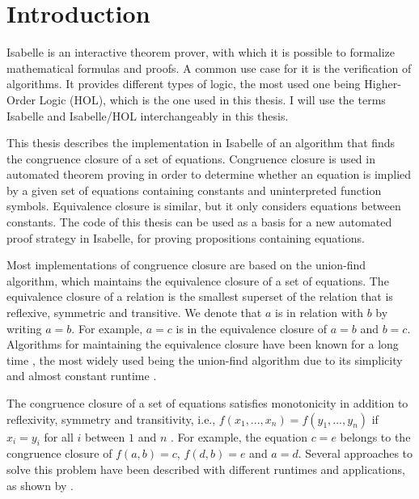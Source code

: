 
\chapter{Introduction}\label{chapter:introduction}

Isabelle \cite{isabelle} is an interactive theorem prover, with which it is possible to formalize mathematical formulas and proofs. A common use case for it is the verification of algorithms. It provides different types of logic, the most used one being Higher-Order Logic (HOL), which is the one used in this thesis. I will use the terms Isabelle and Isabelle/HOL interchangeably in this thesis.

This thesis describes the implementation in Isabelle of an algorithm that finds the congruence closure of a set of equations.
Congruence closure is used in automated theorem proving in order to determine whether an equation is implied by a given set of equations containing constants and uninterpreted function symbols. Equivalence closure is similar, but it only considers equations between constants.
The code of this thesis can be used as a basis for a new automated proof strategy in Isabelle, for proving propositions containing equations.

Most implementations of congruence closure are based on the union-find algorithm, which maintains the equivalence closure of a set of equations. The equivalence closure of a relation is the smallest superset of the relation that is reflexive, symmetric and transitive. We denote that $a$ is in relation with $b$ by writing $a = b$. For example, $a = c$ is in the equivalence closure of $a = b$ and $b = c$. Algorithms for maintaining the equivalence closure have been known for a long time \cite{unionfind-og}, the most widely used being the union-find algorithm due to its simplicity and almost constant runtime \cite{Tarjan}.

The congruence closure of a set of equations satisfies monotonicity in addition to reflexivity, symmetry and transitivity, i.e., $f(x_1, ... ,x_n) = f(y_1, ... ,y_n)$ if $x_i = y_i$ for all $i$ between $1$ and $n$ \cite{Nieuwenhuis}. For example, the equation $c = e$ belongs to the congruence closure of $f(a,b) = c$, $f(d,b) = e$ and $a = d$. Several approaches to solve this problem have been described with different runtimes and applications, as shown by \cite{congruenceclosure-og2,congruenceclosure-og,congruenceclosure-og3,Nieuwenhuis}.

